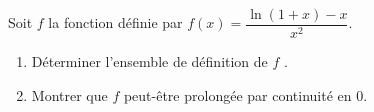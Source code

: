 
\begin{exercice}\label{exoautoanalyseCTU-52}


 
 Soit $f$ la fonction définie par $f(x)=\dfrac{\ln(1+x)-x}{x^2}$.
\begin{enumerate}
\item Déterminer l'ensemble de définition de $f$ .
\item Montrer que $f$ peut-être prolongée par continuité en 0.
\end{enumerate}




\end{exercice}
